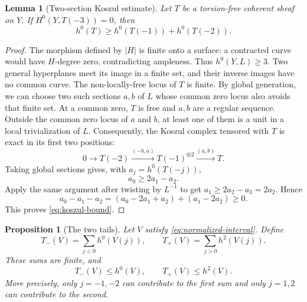 \documentclass[11pt,reqno]{amsart}
\numberwithin{equation}{section}
\newtheorem{proposition}[theorem]{Proposition}
\newtheorem{lemma}[theorem]{Lemma}
\theoremstyle{definition}
\theoremstyle{remark}
\begin{document}
\begin{lemma}[Two-section Koszul estimate]\label{lem:koszul}
Let $T$ be a torsion-free coherent sheaf on $Y$. If $H^0(Y,T(-3))=0$,
then
\begin{equation}\label{eq:koszul-bound}
 h^0(T)\geq h^0(T(-1))+h^0(T(-2)).
\end{equation}
\end{lemma}

\begin{proof}
The morphism defined by $|H|$ is finite onto a surface: a contracted
curve would have $H$-degree zero, contradicting ampleness. Thus
$h^0(Y,L)\geq3$. Two general hyperplanes meet its image in a finite
set, and their inverse images have no common curve.
The non-locally-free locus of $T$ is finite. By global generation,
we can choose two such sections $a,b$ of $L$ whose common zero locus
also avoids that finite set. At a common zero, $T$ is free and $a,b$
are a regular sequence. Outside the common zero locus of $a$ and $b$,
at least one of them is a unit in a local trivialization of $L$.
Consequently, the Koszul complex tensored with $T$ is exact in its
first two positions:
\[
 0\longrightarrow T(-2)\xrightarrow{(-b,a)}T(-1)^{\oplus2}
   \xrightarrow{(a,b)}T.
\]
Taking global sections gives, with $a_j=h^0(T(-j))$,
\[
 a_0\geq2a_1-a_2.
\]
Apply the same argument after twisting by $L^{-1}$ to get
$a_1\geq2a_2-a_3=2a_2$. Hence
\[
 a_0-a_1-a_2
   =(a_0-2a_1+a_2)+(a_1-2a_2)\geq0.
\]
This proves \eqref{eq:koszul-bound}.
\end{proof}

\begin{proposition}[The two tails]\label{prop:tails}
Let $V$ satisfy \eqref{eq:normalized-interval}. Define
\begin{equation}\label{eq:tails}
 T_-(V)=\sum_{j<0}h^0(V(j)),\qquad
 T_+(V)=\sum_{j>0}h^2(V(j)).
\end{equation}
These sums are finite, and
\begin{equation}\label{eq:tail-bounds}
 T_-(V)\leq h^0(V),\qquad T_+(V)\leq h^2(V).
\end{equation}
More precisely, only $j=-1,-2$ can contribute to the first sum and
only $j=1,2$ can contribute to the second.
\end{proposition}
\end{document}
